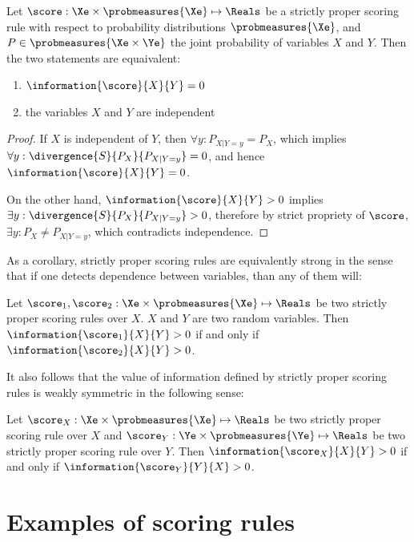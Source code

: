 \begin{theorem}
	Let $\score:\Xe\times\probmeasures{\Xe}\mapsto\Reals$ be a strictly proper scoring rule with respect to probability distributions $\probmeasures{\Xe}$, and $P\in\probmeasures{\Xe\times\Ye}$ the joint probability of variables $X$ and $Y$. Then the two statements are equaivalent:
	\begin{enumerate}
		\item $\information{\score}{X}{Y} = 0$
		\item the variables $X$ and $Y$ are independent
	\end{enumerate}
	\begin{proof}
		If $X$ is independent of $Y$, then $\forall y: P_{X\vert Y=y} = P_{X}$, which implies $\forall y:  \divergence{S}{P_{X}}{P_{X\vert Y=y}}=0$, and hence $\information{\score}{X}{Y} = 0$.
		
		On the other hand, $\information{\score}{X}{Y} > 0$ implies $\exists y: \divergence{S}{P_{X}}{P_{X\vert Y=y}} > 0$, therefore by strict propriety of $\score$, $\exists y: P_X \neq P_{X\vert Y=y}$, which contradicts independence.
	\end{proof}
\end{theorem}

As a corollary, strictly proper scoring rules are equivalently strong in the sense that if one detects dependence between variables, than any of them will:

\begin{corollary}
	Let $\score_1,\score_2:\Xe\times\probmeasures{\Xe}\mapsto\Reals$ be two strictly proper scoring rules over $X$. $X$ and $Y$ are two random variables. Then $\information{\score_1}{X}{Y} > 0$ if and only if $\information{\score_2}{X}{Y} > 0$.
\end{corollary}

It also follows that the value of information defined by strictly proper scoring rules is weakly symmetric in the following sense:

\begin{corollary}
	Let $\score_X:\Xe\times\probmeasures{\Xe}\mapsto\Reals$ be two strictly proper scoring rule over $X$ and $\score_Y:\Ye\times\probmeasures{\Ye}\mapsto\Reals$ be two strictly proper scoring rule over $Y$.  Then $\information{\score_X}{X}{Y} > 0$ if and only if $\information{\score_Y}{Y}{X} > 0$.
\end{corollary}

\section{Examples of scoring rules}

